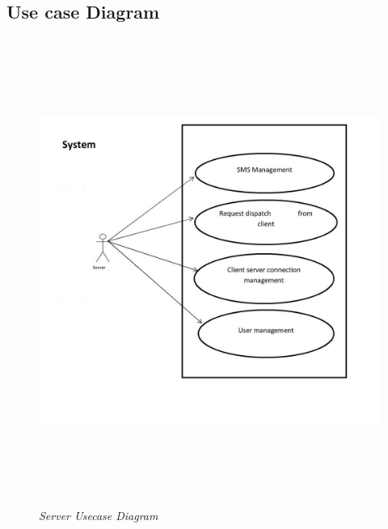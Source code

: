 \subsection{Use case Diagram }
\begin{figure}[h!]
\centering
\includegraphics[height=6in, width = 6in]{U2.jpg}
\caption{\emph{Server Usecase Diagram}}
\label{fig:1}
\end{figure}
\newpage
